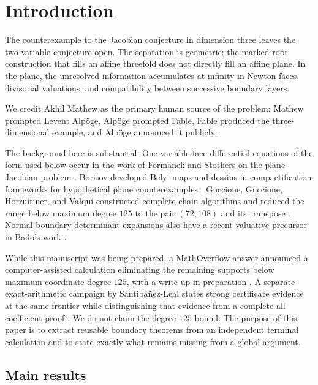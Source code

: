 \documentclass[11pt,reqno]{amsart}
\begin{document}
\section{Introduction}
\label{sec:introduction}

The counterexample to the Jacobian conjecture in dimension three leaves the
two-variable conjecture open.  The separation is geometric: the marked-root
construction that fills an affine threefold does not directly fill an
affine plane.  In the plane, the unresolved information accumulates at
infinity in Newton faces, divisorial valuations, and compatibility between
successive boundary layers.

We credit Akhil Mathew as the primary human source of the problem: Mathew
prompted Levent Alp\"oge, Alp\"oge prompted Fable, Fable produced the
three-dimensional example, and Alp\"oge announced it publicly
\cite{ulam2026counterexample,alpoge2026announcement}.

The background here is substantial.  One-variable face differential
equations of the form used below occur in the work of Formanek and Stothers
on the plane Jacobian problem \cite{formanek2011stothers}.  Borisov developed
Belyi maps and dessins in compactification frameworks for hypothetical
plane counterexamples \cite{borisov2009geometric,borisov2020frameworks}.  Guccione, Guccione,
Horruitiner, and Valqui constructed complete-chain algorithms and reduced
the range below maximum degree \(125\) to the pair \((72,108)\) and its
transpose \cite{guccioneEtAl2017algorithms,guccioneEtAl2022degree108}.
Normal-boundary determinant expansions also have a recent valuative
precursor in Bado's work \cite{bado2026valuative}.

While this manuscript was being prepared, a MathOverflow answer announced a
computer-assisted calculation eliminating the remaining supports below
maximum coordinate degree \(125\), with a write-up in preparation
\cite{ratto3423degree125}.  A separate
exact-arithmetic campaign by Santibáñez-Leal states strong certificate
evidence at the same frontier while distinguishing that evidence from a
complete all-coefficient proof \cite{santibanezLeal2026planar}.  We do not
claim the degree-\(125\) bound.  The purpose of this paper is to extract
reusable boundary theorems from an independent terminal calculation and to
state exactly what remains missing from a global argument.

\subsection{Main results}
\end{document}
